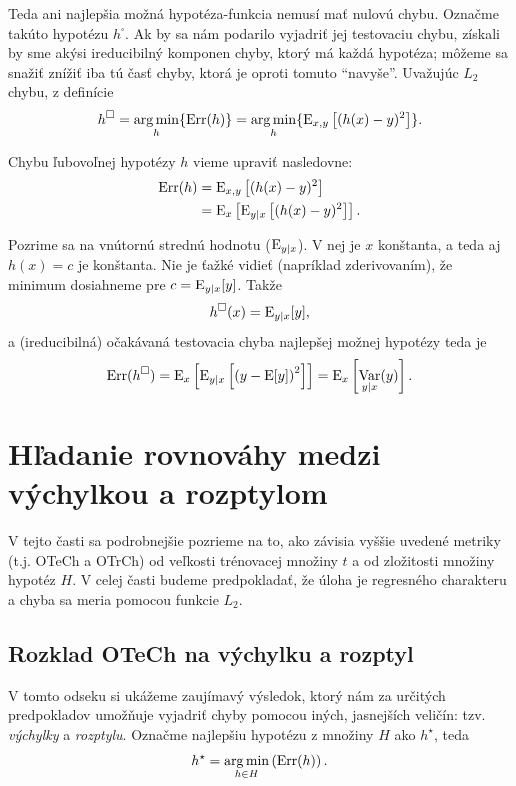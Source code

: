 Teda ani najlepšia možná hypotéza-funkcia nemusí
mať nulovú chybu. Označme takúto hypotézu $h^\square$. Ak by sa nám
podarilo vyjadriť jej testovaciu chybu, získali by sme akýsi ireducibilný komponen chyby, ktorý má každá hypotéza; môžeme sa snažiť znížiť iba tú časť
chyby, ktorá je oproti tomuto ``navyše''. Uvažujúc $L_2$ chybu, z definície
$$h^{\square} = \operatorname*{{arg\,min}}_h \{ \mathrm{Err}(h) \} = \operatorname*{{arg\,min}}_h \{ \mathrm{E}_{x,y} \left[ (h(x) - y)^2 \right] \}.$$

Chybu ľubovoľnej hypotézy $h$ vieme upraviť nasledovne:
\begin{align}
  \mathrm{Err}(h)
    &= \mathrm{E}_{x,y} \left[ (h(x) - y)^2 \right] \\
    &= \mathrm{E}_x \left[ \mathrm{E}_{y|x} \left[ (h(x) - y)^2 \right] \right].
\end{align}

Pozrime sa na vnútornú strednú hodnotu ($\mathrm{E}_{y|x}$). V nej je $x$ konštanta, a
teda aj $h(x) = c$ je konštanta. Nie je ťažké vidieť
(napríklad zderivovaním), že
minimum dosiahneme pre $c = \mathrm{E}_{y|x}[y]$. Takže
$$h^{\square}(x) = \mathrm{E}_{y|x}[y],$$
a (ireducibilná) očakávaná testovacia chyba najlepšej možnej hypotézy teda je
$$\mathrm{Err}(h^{\square}) = \mathrm{E}_{x} \left[ \mathrm{E}_{y|x} \left[ \left( y - \mathrm{E}[y] \right)^2 \right] \right] = \mathrm{E}_{x} \left[ \operatorname*{\mathrm{Var}}_{y|x}(y) \right].$$


\section{Hľadanie rovnováhy medzi výchylkou a rozptylom}

V tejto časti sa podrobnejšie pozrieme na to, ako závisia vyššie
uvedené metriky (t.j. OTeCh a OTrCh) od veľkosti trénovacej množiny
$t$ a od zložitosti množiny hypotéz $H$. V celej časti budeme predpokladať,
že úloha je regresného charakteru a chyba sa meria pomocou funkcie $L_2$.

\subsection{Rozklad OTeCh na výchylku a rozptyl}

\newcommand{\vVychylka}{\text{výchylka}}
\newcommand{\vRozptyl}{\text{rozptyl}}
\newcommand{\vRozptylT}{\text{trénovací rozptyl}}
\newcommand{\vOTrChAlg}{\text{očakávaná trénovacia chyba}}


V tomto odseku si ukážeme zaujímavý výsledok, ktorý nám za určitých
predpokladov umožňuje vyjadriť chyby pomocou iných, jasnejších veličín:
tzv. \emph{výchylky} a \emph{rozptylu}.
Označme najlepšiu hypotézu z množiny $H$ ako $h^\star$, teda
$$h^\star = \operatorname*{{arg\,min}}_{h \in H} \left( \mathrm{Err}(h) \right).$$

